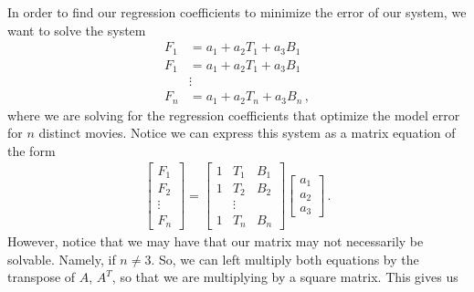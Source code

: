\documentclass[11pt]{article}
\begin{document}
In order to find our regression coefficients to minimize the error of our system, we want to solve the system
\begin{align*}
    F_1 &  = a_1 + a_2 T_1 + a_3 B_1 \\  %
    F_1 & = a_1 + a_2 T_1 + a_3 B_1 \\
    & \vdots \\
    F_n & = a_1 + a_2 T_n + a_3 B_n \, ,
\end{align*}
where we are solving for the regression coefficients that optimize the model error for $n$ distinct movies.  
Notice we can express this system as a matrix equation of the form
\label{matrix-system-2var-linear}
\begin{align*}
    \begin{bmatrix}
        F_1\\
        F_2 \\
        \vdots \\
        F_n
    \end{bmatrix}
    =
    \begin{bmatrix}
        1 & T_1 & B_1 \\
        1 & T_2 & B_2 \\
        & \vdots & \\
        1 & T_n & B_n
    \end{bmatrix} 
    \begin{bmatrix}
        a_1 \\
        a_2 \\
        a_3
    \end{bmatrix} \, .
\end{align*}
However, notice that we may have that our matrix may not necessarily be solvable.  
Namely, if $n \neq 3$.  
So, we can left multiply both equations by the transpose of $A$, $A^T$, so that we are multiplying by a square matrix. 
This gives us
\end{document}

